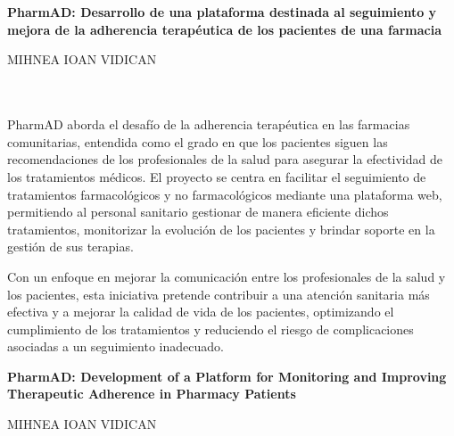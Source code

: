 \chapter*{}





\thispagestyle{empty}

\begin{center}
{\large\bfseries PharmAD: Desarrollo de una plataforma destinada al seguimiento y mejora de la adherencia terapéutica de los pacientes de una farmacia}\\
\end{center}
\begin{center}
MIHNEA IOAN VIDICAN\\
\end{center}

\\

\vspace{0.7cm}
\\

PharmAD aborda el desafío de la adherencia terapéutica en las farmacias comunitarias, entendida como el grado en que los pacientes siguen las recomendaciones de los profesionales de la salud para asegurar la efectividad de los tratamientos médicos. El proyecto se centra en facilitar el seguimiento de tratamientos farmacológicos y no farmacológicos mediante una plataforma web, permitiendo al personal sanitario gestionar de manera eficiente dichos tratamientos, monitorizar la evolución de los pacientes y brindar soporte en la gestión de sus terapias. \

Con un enfoque en mejorar la comunicación entre los profesionales de la salud y los pacientes, esta iniciativa pretende contribuir a una atención sanitaria más efectiva y a mejorar la calidad de vida de los pacientes, optimizando el cumplimiento de los tratamientos y reduciendo el riesgo de complicaciones asociadas a un seguimiento inadecuado.

\cleardoublepage


\thispagestyle{empty}


\begin{center}
{\large\bfseries PharmAD: Development of a Platform for Monitoring and Improving Therapeutic Adherence in Pharmacy Patients}\\
\end{center}
\begin{center}
MIHNEA IOAN VIDICAN\\
\end{center}

